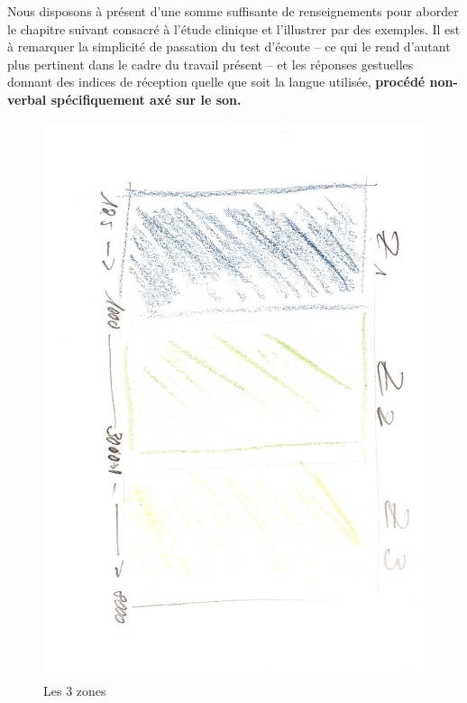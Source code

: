 Nous disposons à présent d'une somme suffisante de renseignements pour
aborder le chapitre suivant consacré à l'étude clinique et
l'illustrer par des exemples.
Il est à remarquer la simplicité de
passation du test d'écoute -- ce qui le rend d'autant
plus pertinent dans le cadre du travail présent -- et les réponses gestuelles
 donnant des indices de réception %
quelle que soit la langue utilisée,\textbf{ procédé non-verbal
spécifiquement axé sur le son.}



\begin{figure}
	\centering
	\includegraphics[width=0.4\linewidth,angle=90]{images/3zones.jpg}
	\caption[Les 3 zones]{Les 3 zones}
	\label{3zones}
\end{figure}
